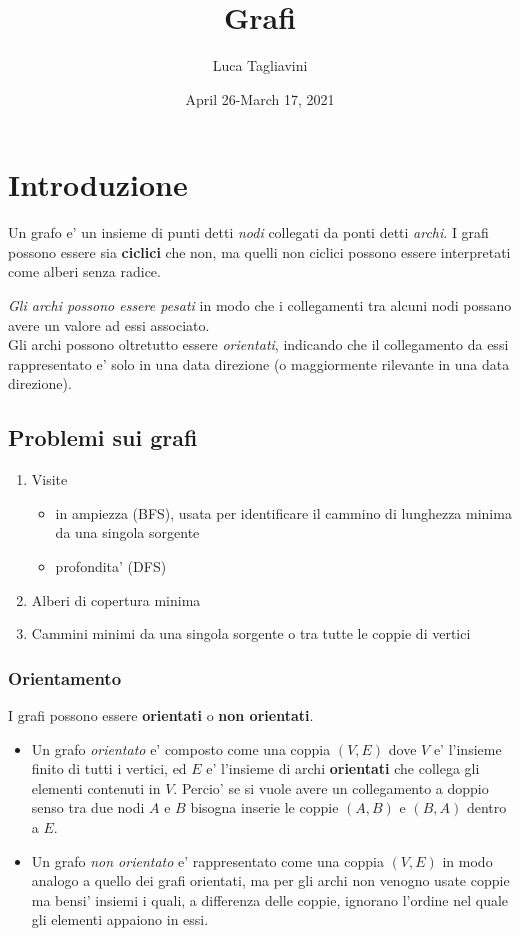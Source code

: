 \documentclass{article}
\title{\textbf{Grafi}}
\author{Luca Tagliavini}
\date{April 26-March 17, 2021}
\begin{document}
\maketitle
\tableofcontents
\pagebreak

\section{Introduzione}

Un grafo e' un insieme di punti detti \emph{nodi} collegati da ponti detti
\emph{archi}. I grafi possono essere sia \textbf{ciclici} che non, ma quelli
non ciclici possono essere interpretati come alberi senza radice.

\emph{Gli archi possono essere pesati} in modo che i collegamenti tra alcuni nodi
possano avere un valore ad essi associato. \\
Gli archi possono oltretutto essere \emph{orientati}, indicando che il
collegamento da essi rappresentato e' solo in una data direzione (o maggiormente
rilevante in una data direzione).

\subsection{Problemi sui grafi}

\begin{enumerate}
  \item Visite
    \begin{itemize}
      \item in ampiezza (BFS), usata per identificare il cammino di lunghezza
        minima da una singola sorgente
      \item profondita' (DFS)
    \end{itemize}
  \item Alberi di copertura minima
  \item Cammini minimi da una singola sorgente o tra tutte le coppie di vertici
\end{enumerate}

\subsubsection{Orientamento}

I grafi possono essere \textbf{orientati} o \textbf{non orientati}.

\begin{itemize}
  \item Un grafo \emph{orientato} e' composto come una coppia $(V, E)$ dove $V$
    e' l'insieme finito di tutti i vertici, ed $E$ e' l'insieme di archi
    \textbf{orientati} che collega gli elementi contenuti in $V$. Percio'
    se si vuole avere un collegamento a doppio senso tra due nodi $A$ e $B$
    bisogna inserie le coppie $(A, B)$ e $(B, A)$ dentro a $E$.
  \item Un grafo \emph{non orientato} e' rappresentato come una coppia $(V, E)$
    in modo analogo a quello dei grafi orientati, ma per gli archi non venogno
    usate coppie ma bensi' insiemi i quali, a differenza delle coppie, ignorano
    l'ordine nel quale gli elementi appaiono in essi.
\end{itemize}
\end{document}
